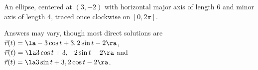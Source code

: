 {An ellipse, centered at $(3,-2)$ with horizontal major axis of length 6 and minor axis of length 4, traced once clockwise on $[0,2\pi]$. 
}
{
Answers may vary, though most direct solutions are\\
$\vec r(t) = \la -3\cos t+3,2\sin t-2\ra$,\\
$\vec r(t) = \la 3\cos t+3,-2\sin t-2\ra$ and \\
$\vec r(t) = \la 3\sin t+3,2\cos t-2\ra$.

}

